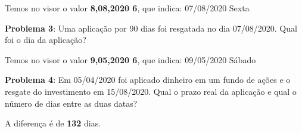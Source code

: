 Temos no visor o valor \textbf{8,08,2020 6}, que indica: 07/08/2020 Sexta

\textbf{Problema 3}: Uma aplicação por 90 dias foi resgatada no dia 07/08/2020. Qual foi o dia da aplicação?

              

Temos no visor o valor \textbf{9,05,2020 6}, que indica: 09/05/2020 Sábado

\textbf{Problema 4}: Em 05/04/2020 foi aplicado dinheiro em um fundo de ações e o resgate do investimento em 15/08/2020. Qual o prazo real da aplicação e qual o número de dias entre as duas datas?

                    

A diferença é de \textbf{132} dias.
